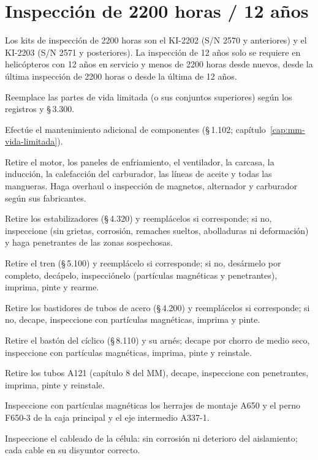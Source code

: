 \section{Inspección de 2200 horas / 12 años}

\begin{nota}
Los kits de inspección de 2200 horas son el KI-2202 (S/N 2570 y anteriores) y el KI-2203 (S/N 2571 y posteriores). La inspección de 12 años solo se requiere en helicópteros con 12 años en servicio y menos de 2200 horas desde nuevos, desde la última inspección de 2200 horas o desde la última de 12 años.
\end{nota}

\begin{pasos}
\item Reemplace las partes de vida limitada (o sus conjuntos superiores) según los registros y \S\,3.300.
\item Efectúe el mantenimiento adicional de componentes (\S\,1.102; capítulo~\ref{cap:mm-vida-limitada}).
\item Retire el motor, los paneles de enfriamiento, el ventilador, la carcasa, la inducción, la calefacción del carburador, las líneas de aceite y todas las mangueras. Haga overhaul o inspección de magnetos, alternador y carburador según sus fabricantes.
\item Retire los estabilizadores (\S\,4.320) y reemplácelos si corresponde; si no, inspeccione (sin grietas, corrosión, remaches sueltos, abolladuras ni deformación) y haga penetrantes de las zonas sospechosas.
\item Retire el tren (\S\,5.100) y reemplácelo si corresponde; si no, desármelo por completo, decápelo, inspecciónelo (partículas magnéticas y penetrantes), imprima, pinte y rearme.
\item Retire los bastidores de tubos de acero (\S\,4.200) y reemplácelos si corresponde; si no, decape, inspeccione con partículas magnéticas, imprima y pinte.
\item Retire el bastón del cíclico (\S\,8.110) y su arnés; decape por chorro de medio seco, inspeccione con partículas magnéticas, imprima, pinte y reinstale.
\item Retire los tubos A121 (capítulo 8 del MM), decape, inspeccione con penetrantes, imprima, pinte y reinstale.
\item Inspeccione con partículas magnéticas los herrajes de montaje A650 y el perno F650-3 de la caja principal y el eje intermedio A337-1.
\item Inspeccione el cableado de la célula: sin corrosión ni deterioro del aislamiento; cada cable en su disyuntor correcto.

\end{pasos}
